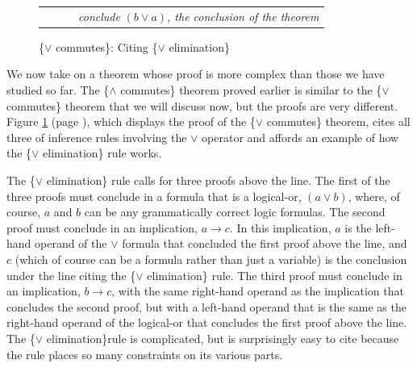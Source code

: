 {\begin{figure}
\begin{center}
\begin{tabular}{ll}
       &~~~~\emph{conclude} $(b \vee a)$\emph{, the conclusion of the theorem}\\
\end{tabular}
\end{center}
\caption{\{$\vee$ commutes\}: Citing \{$\vee$ elimination\}}
\label{fig:or-commutes-proof}
\end{figure}

We now take on a theorem whose proof is more complex
than those we have studied so far.
The \{$\wedge$ commutes\} theorem proved earlier
is similar to the \{$\vee$ commutes\} theorem
that we will discuss now, but the proofs are very different.
Figure \ref{fig:or-commutes-proof} (page \pageref{fig:or-commutes-proof}),
which displays the proof of the \{$\vee$ commutes\} theorem,
cites all three of inference rules involving the $\vee$ operator
and affords an example of how the \{$\vee$ elimination\} rule works.

The \{$\vee$ elimination\} rule calls for three proofs above the line.
The first of the three proofs must conclude in a formula
that is a logical-or, $(a \vee b)$, where, of course,
$a$ and $b$ can be any grammatically correct logic formulas.
The second proof must conclude in an implication, $a \rightarrow c$.
In this implication, $a$ is the left-hand operand of the $\vee$ formula
that concluded the first proof above the line,
and $c$ (which of course can be a formula rather than just a variable)
is the conclusion under the line citing the \{$\vee$ elimination\} rule.
The third proof must conclude in an implication, $b \rightarrow c$,
with the same right-hand operand as the implication that concludes
the second proof, but with a left-hand operand that is the same
as the right-hand operand of the logical-or that concludes the
first proof above the line.
The \{$\vee$ elimination\}rule is complicated,
but is surprisingly easy to cite
because the rule places so many constraints on its various parts.

}

